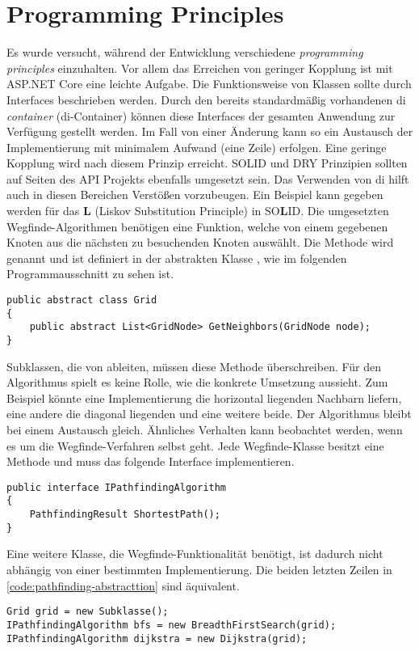 \part{Programming Principles}
Es wurde versucht, während der Entwicklung
verschiedene \textit{programming principles} einzuhalten.
Vor allem das Erreichen von geringer Kopplung ist mit
ASP.NET Core eine leichte Aufgabe.
Die Funktionsweise von Klassen sollte durch Interfaces beschrieben werden.
Durch den bereits standardmäßig vorhandenen \acl{di} \textit{container} (\acs{di}-Container)
können diese Interfaces der gesamten Anwendung zur Verfügung gestellt werden.
Im Fall von einer Änderung kann so ein Austausch der
Implementierung mit minimalem Aufwand (eine Zeile) erfolgen.
Eine geringe Kopplung wird nach diesem Prinzip erreicht.
SOLID und DRY Prinzipien sollten auf Seiten des API Projekts ebenfalls umgesetzt sein.
Das Verwenden von \acs{di} hilft auch in diesen Bereichen Verstößen vorzubeugen.
Ein Beispiel kann gegeben werden für das \textbf{L} (Liskov Substitution Principle)
in SO\textbf{L}ID. Die umgesetzten Wegfinde-Algorithmen benötigen eine
Funktion, welche von einem gegebenen Knoten aus die nächsten zu besuchenden
Knoten auswählt. Die Methode wird 
genannt und ist definiert in der abstrakten Klasse ,
wie im folgenden Programmausschnitt zu sehen ist.

\begin{lstlisting}[caption={\textbf{Grid} Entität},label={code:grid-entity}]
public abstract class Grid
{
    public abstract List<GridNode> GetNeighbors(GridNode node);
}
\end{lstlisting}
Subklassen, die von  ableiten, müssen diese Methode überschreiben.
Für den Algorithmus spielt es keine Rolle, wie die konkrete Umsetzung aussieht.
Zum Beispiel könnte eine Implementierung die horizontal liegenden Nachbarn liefern,
eine andere die diagonal liegenden und eine weitere beide. Der Algorithmus bleibt
bei einem Austausch gleich. Ähnliches Verhalten kann
beobachtet werden, wenn es um die Wegfinde-Verfahren selbst geht.
Jede Wegfinde-Klasse besitzt eine Methode 
und muss das folgende Interface implementieren.
\begin{lstlisting}[caption={Wegfinde-Algorithmus Interface},label={code:i-pathfinding}]
public interface IPathfindingAlgorithm
{
    PathfindingResult ShortestPath();
}
\end{lstlisting}
Eine weitere Klasse, die Wegfinde-Funktionalität benötigt, ist dadurch nicht abhängig
von einer bestimmten Implementierung. Die beiden letzten Zeilen
in \autoref{code:pathfinding-abstracttion} sind äquivalent.
\newpage
\begin{lstlisting}[caption={Abstraktion der Wegfinde-Algorithmen},
label={code:pathfinding-abstracttion}]
Grid grid = new Subklasse();
IPathfindingAlgorithm bfs = new BreadthFirstSearch(grid);
IPathfindingAlgorithm dijkstra = new Dijkstra(grid);
\end{lstlisting}